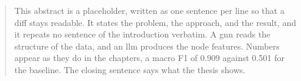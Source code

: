\documentclass[
11pt, %
american, %
singlespacing, %
liststotoc, %
parskip, %
nohyperref, %
consistentlayout, %
]{PSIThesis} %
\begin{document}

\begin{abstract}
\addchaptertocentry{\abstractname} %
This abstract is a placeholder, written as one sentence per line so that a diff stays readable.
It states the problem, the approach, and the result, and it repeats no sentence of the introduction verbatim.
A \ac{gnn} reads the structure of the data, and an \ac{llm} produces the node features.
Numbers appear as they do in the chapters, a macro F1 of 0.909 against 0.501 for the baseline.
The closing sentence says what the thesis shows.
\end{abstract}

\cleardoublepage

{
\hypersetup{linkcolor=black}
\tableofcontents %
}
\restoregeometry


\cleardoublepage
{}
{
\hypersetup{linkcolor=black}
\listoffigures
\cleardoublepage
\listoftables
}
\restoregeometry


\cleardoublepage
\printacronyms[name={List of Acronyms}]

\end{document}
